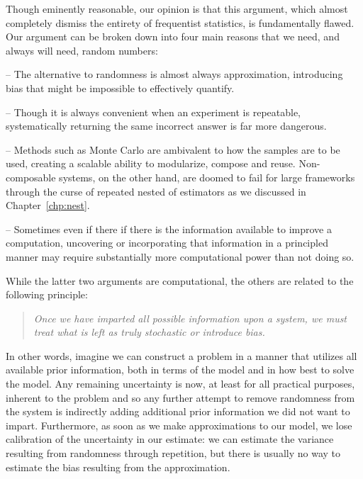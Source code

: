 Though eminently reasonable, our opinion is that this argument, which almost completely dismiss the entirety
of frequentist statistics, is fundamentally flawed.  Our argument can be broken down into four main reasons 
that we need, and always will need, random numbers:
\begin{description}[align=left]
	\vspace{-10pt}
	\setlength\itemsep{-0.1em}
	\item[Honesty and reliability] -- The alternative to randomness is almost always approximation, introducing bias 
	that might be impossible to effectively quantify.
	\item[Lack of repeatability] -- Though it is always convenient when an experiment is repeatable, systematically 
	returning the same incorrect answer is far more dangerous.
	\item[Composability] -- Methods such as Monte Carlo are ambivalent to how the samples are to be used, creating 
	a scalable ability to modularize, compose and reuse.  Non-composable systems, on the other hand, are doomed to fail
	for large frameworks through the curse of repeated nested of estimators as we discussed in Chapter~\ref{chp:nest}.
	\item[Speed and simplicity] -- Sometimes even if there if there is the information available to improve a computation, 
	uncovering or incorporating that information in a principled manner may require substantially more computational 
	power than not doing so.
	\vspace{-10pt}
\end{description}
While the latter two arguments are computational, the others are related to the following principle:
\begin{quote}
	\vspace{-4pt}
	\emph{Once we have imparted all possible information upon a system, we must treat what is left as truly 
		stochastic or introduce bias.}
	\vspace{-8pt}
\end{quote}
In other words, imagine we can construct a problem in a manner that utilizes all available prior information,
both in terms of the model and in how best to solve the model.
Any remaining uncertainty is now, at least for all practical purposes, inherent to the problem and so any
further attempt to remove randomness from the system is indirectly adding additional prior information we
did not want to impart.  Furthermore, as soon as we make approximations to our model,
we lose calibration of the uncertainty in our estimate: we can estimate the variance
resulting from randomness through repetition, but there is usually no way to estimate the bias
resulting from the approximation.

